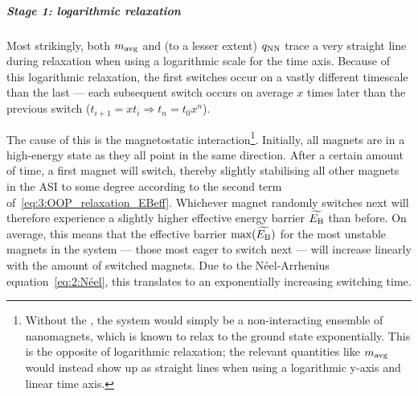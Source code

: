 \subparagraph{Stage 1: logarithmic relaxation}
Most strikingly, both $m_\mathrm{avg}$ and (to a lesser extent) $q_\mathrm{NN}$ trace a very straight line during relaxation when using a logarithmic scale for the time axis.
Because of this logarithmic relaxation, the first switches occur on a vastly different timescale than the last --- each subsequent switch occurs on average $x$ times later than the previous switch ($t_{i+1} = x t_i \Rightarrow t_n = t_0 x^n$). \par
The cause of this is the magnetostatic interaction\footnote{
	Without the , the system would simply be a non-interacting ensemble of nanomagnets, which is known to relax to the ground state exponentially.
	This is the opposite of logarithmic relaxation; the relevant quantities like $m_\mathrm{avg}$ would instead show up as straight lines when using a logarithmic y-axis and linear time axis.
}.
Initially, all magnets are in a high-energy state as they all point in the same direction.
After a certain amount of time, a first magnet will switch, thereby slightly stabilising all other magnets in the ASI to some degree according to the second term of~\cref{eq:3:OOP_relaxation_EBeff}.
Whichever magnet randomly switches next will therefore experience a slightly higher effective energy barrier $\widetilde{E_\mathrm{B}}$ than before.
On average, this means that the effective barrier $\max(\widetilde{E_\mathrm{B}})$ for the most unstable magnets in the system --- those most eager to switch next --- will increase linearly with the amount of switched magnets.
Due to the N\'eel-Arrhenius equation~\eqref{eq:2:Néel}, this translates to an exponentially increasing switching time.

